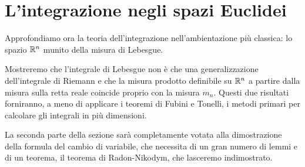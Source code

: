 \section{L'integrazione negli spazi Euclidei}
Approfondiamo ora la teoria dell'integrazione nell'ambientazione più classica: lo spazio $\mathbb R^n$ munito della misura di Lebesgue.

Mostreremo che l'integrale di Lebesgue non è che una generalizzazione dell'integrale di Riemann e che la misura prodotto definibile su $\mathbb R^n$ a partire dalla misura sulla retta reale coincide proprio con la misura $m_n$. Questi due risultati forniranno, a meno di applicare i teoremi di Fubini e Tonelli, i metodi primari per calcolare gli integrali in più dimensioni.

La seconda parte della sezione sarà completamente votata alla dimostrazione della formula del cambio di variabile, che necessita di un gran numero di lemmi e di un teorema, il teorema di Radon-Nikodym, che lasceremo indimostrato.


